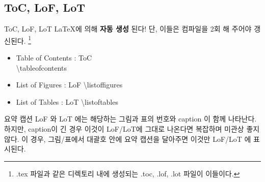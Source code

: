 \documentclass[12pt]{beamer}
\begin{document}
\subsection{ToC, LoF, LoT}
\begin{frame}{ToC, LoF, LoT}
	\LaTeX 에 의해 \textbf{자동 생성} 된다! 단, 이들은 컴파일을 2회 해 주어야 갱신된다. \footnote{.tex 파일과 같은 디렉토리 내에 생성되는 .toc, .lof, .lot 파일이 이들이다.}
	\begin{itemize}
		\item Table of Contents : ToC \\
		\textbackslash tableofcontents
		\item List of Figures : LoF
		\textbackslash listoffigures
		\item List of Tables : LoT
		\textbackslash listoftables
	\end{itemize}
	
\end{frame}
\begin{frame}{요약 캡션}
	LoF 와 LoT 에는 해당하는 그림과 표의 번호와 caption 이 함께 나타난다. 하지만, caption이 긴 경우 이것이 LoF/LoT에 그대로 나온다면 복잡하며 미관상 좋지 않다. 이 경우, 그림/표에서 대괄호 안에 요약 캡션을 달아주면 이것만 LoF/LoT 에 표시된다.
	\begin{center}
		\small
	\end{center}
\end{frame}
\end{document}
